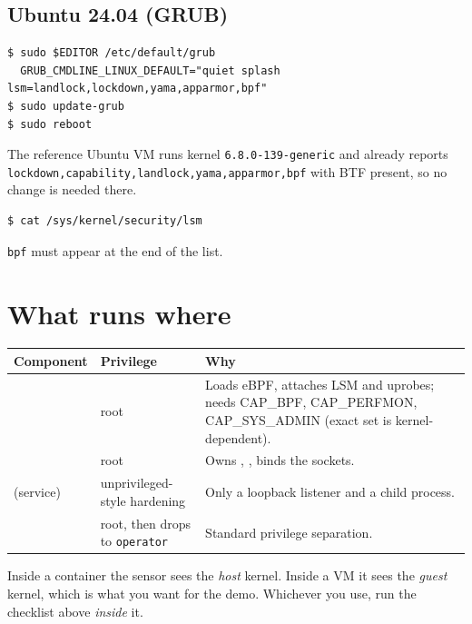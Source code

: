 \subsection*{Ubuntu 24.04 (GRUB)}
\begin{lstlisting}[style=console]
$ sudo $EDITOR /etc/default/grub
  GRUB_CMDLINE_LINUX_DEFAULT="quiet splash lsm=landlock,lockdown,yama,apparmor,bpf"
$ sudo update-grub
$ sudo reboot
\end{lstlisting}
\begin{kbnote}
The reference Ubuntu VM runs kernel \texttt{6.8.0-139-generic} and already reports
\texttt{lockdown,capability,landlock,yama,apparmor,bpf} with BTF present, so no change is needed there.
\end{kbnote}
\fi

\begin{lstlisting}[style=console]
$ cat /sys/kernel/security/lsm
\end{lstlisting}
\texttt{bpf} must appear at the end of the list.

\section{What runs where}
\begin{center}
\small
\begin{tabularx}{\textwidth}{@{}L{3.6cm}L{2.6cm}Y@{}}
\toprule
\textbf{Component} & \textbf{Privilege} & \textbf{Why}\\
\midrule
{} & root & Loads eBPF, attaches LSM and uprobes; needs CAP\_BPF, CAP\_PERFMON, CAP\_SYS\_ADMIN (exact set is kernel-dependent).\\
 & root & Owns , , binds the sockets.\\
 (service) & unprivileged-style hardening & Only a loopback listener and a child process.\\
 & root, then drops to \texttt{operator} & Standard  privilege separation.\\
\bottomrule
\end{tabularx}
\end{center}

\begin{kbwarn}
Inside a container the sensor sees the \emph{host} kernel. Inside a VM it sees the \emph{guest} kernel, which
is what you want for the demo. Whichever you use, run the checklist above \emph{inside} it.
\end{kbwarn}
